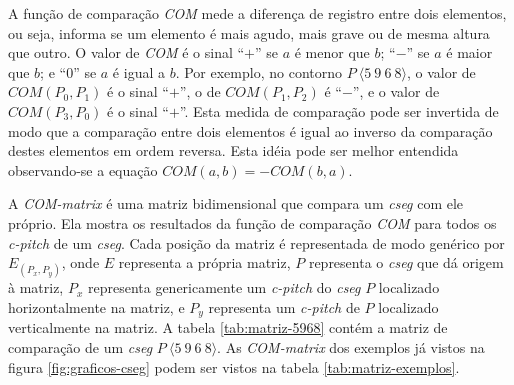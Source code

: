\documentclass[brazil]{article}
\newcommand{\termo}[1]{\textit{#1}}
\begin{document}
A função de comparação \termo{COM} mede a diferença de registro entre
dois elementos, ou seja, informa se um elemento é mais agudo, mais
grave ou de mesma altura que outro. O valor de \termo{COM} é o sinal
``$+$'' se $a$ é menor que $b$; ``$-$'' se $a$ é maior que $b$; e
``$0$'' se $a$ é igual a $b$. Por exemplo, no contorno
$P\:\langle5\:9\:6\:8\rangle$, o valor de $COM(P_0,P_1)$ é o sinal
``$+$'', o de $COM(P_1,P_2)$ é ``$-$'', e o valor de $COM(P_3,P_0)$ é
o sinal ``$+$''. Esta medida de comparação pode ser invertida de modo
que a comparação entre dois elementos é igual ao inverso da comparação
destes elementos em ordem reversa. Esta idéia pode ser melhor
entendida observando-se a equação $COM(a,b)=-COM(b,a)$.

A \termo{COM-matrix} é uma matriz bidimensional que compara um
\termo{cseg} com ele próprio. Ela mostra os resultados da função de
comparação \termo{COM} para todos os \termo{c-pitch} de um
\termo{cseg}. Cada posição da matriz é representada de modo genérico
por $E_(P_x,P_y)$, onde $E$ representa a própria matriz, $P$
representa o \termo{cseg} que dá origem à matriz, $P_x$ representa
genericamente um \termo{c-pitch} do \termo{cseg} $P$ localizado
horizontalmente na matriz, e $P_y$ representa um \termo{c-pitch} de
$P$ localizado verticalmente na matriz. A tabela \ref{tab:matriz-5968}
contém a matriz de comparação de um \termo{cseg}
$P\:\langle5\:9\:6\:8\rangle$. As \termo{COM-matrix} dos exemplos já
vistos na figura \ref{fig:graficos-cseg} podem ser vistos na tabela
\ref{tab:matriz-exemplos}.
\end{document}
